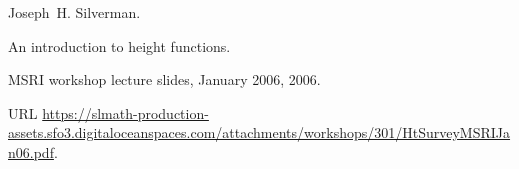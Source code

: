 Joseph~H. Silverman.

\newblock An introduction to height functions.

\newblock MSRI workshop lecture slides, January 2006, 2006.

\newblock URL
  \url{https://slmath-production-assets.sfo3.digitaloceanspaces.com/attachments/workshops/301/HtSurveyMSRIJan06.pdf}.

